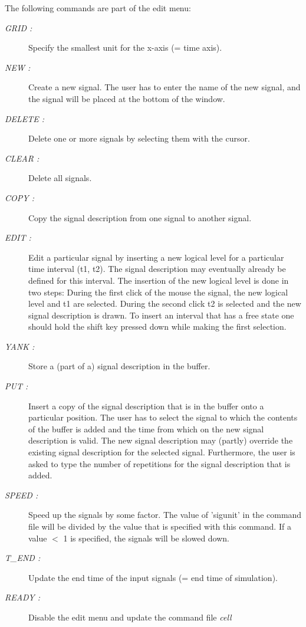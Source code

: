 The following commands are part of the edit menu:
\begin{description}
\item[{\it GRID : }]
Specify the smallest unit for the x-axis (= time axis).
\item[{\it NEW : }]
Create a new signal. The user has to enter the name of the new
signal, and the signal will be placed at the bottom of
the window.
\item[{\it DELETE : }]
Delete one or more signals by selecting them with the cursor.
\item[{\it CLEAR : }]
Delete all signals.
\item[{\it COPY : }]
Copy the signal description from one signal to another signal.
\item[{\it EDIT : }]
Edit a particular signal by inserting a new logical level
for a particular time interval (t1, t2).
The signal description may eventually already be defined for this interval.
The insertion of the new logical level is done in two steps:
During the first click of the mouse
the signal, the new logical level and t1 are selected.
During the second click t2 is selected and the new signal
description is drawn.
To insert an interval that has a free state 
one should hold the shift key pressed down
while making the first selection.
\item[{\it YANK : }]
Store a (part of a) signal description in the buffer.
\item[{\it PUT : }]
Insert a copy of the signal description that is in the buffer onto
a particular position.
The user has to select the signal to which the contents
of the buffer is added and the time from which on the
new signal description is valid.
The new signal description may (partly) override the existing
signal description for the selected signal.
Furthermore,
the user is asked to type the number of repetitions for the signal
description that is added.
\item [ {\it SPEED : }]
Speed up the signals by some factor.  The value of
          'sigunit' in the command file will be divided by the
          value that is specified with this command.  If a value
         $<$ 1 is specified, the signals will be slowed down.

\item[{\it T\_END : }]
Update the end time of the input signals (= end time of simulation).
\item[{\it READY : }]
Disable the edit menu and
update the command file %
\it cell\rm%
\end{description}
